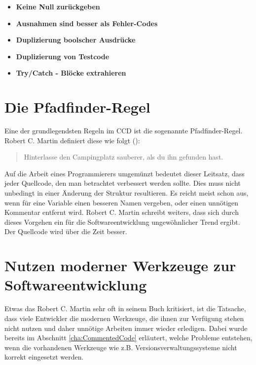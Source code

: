 \begin{itemize}
	\item \textbf{Keine Null zurückgeben}
	\item \textbf{Ausnahmen sind besser als Fehler-Codes}
	\item \textbf{Duplizierung boolscher Ausdrücke}
	\item \textbf{Duplizierung von Testcode}
	\item \textbf{Try/Catch - Blöcke extrahieren}
\end{itemize}

\section{Die Pfadfinder-Regel}
Eine der grundlegendsten Regeln im CCD ist die sogenannte Pfadfinder-Regel. Robert C. Martin definiert diese wie folgt (\cite[Seite 43]{Martin2008}):

\begin{quote}
	Hinterlasse den Campingplatz sauberer, als du ihn gefunden hast.
\end{quote}

\SuperPar Auf die Arbeit eines Programmierers umgemünzt bedeutet dieser Leitsatz, dass jeder Quellcode, den man betrachtet verbessert werden sollte. Dies muss nicht unbedingt in einer Änderung der Struktur resultieren. Es reicht meist schon aus, wenn für eine Variable einen besseren Namen vergeben, oder einen unnötigen Kommentar entfernt wird. Robert C. Martin schreibt weiters, dass sich durch dieses Vorgehen ein für die Softwareentwicklung ungewöhnlicher Trend ergibt. Der Quellcode wird über die Zeit besser. 

\section{Nutzen moderner Werkzeuge zur Softwareentwicklung}
\label{cha:UsefullTools}
Etwas das Robert C. Martin sehr oft in seinem Buch kritisiert, ist die Tatsache, dass viele Entwickler die modernen Werkzeuge, die ihnen zur Verfügung stehen nicht nutzen und daher unnötige Arbeiten immer wieder erledigen. Dabei wurde bereits im Abschnitt \ref{cha:CommentedCode} erläutert, welche Probleme entstehen, wenn die vorhandenen Werkzeuge wie z.B. Versionsverwaltungssysteme nicht korrekt eingesetzt werden.


